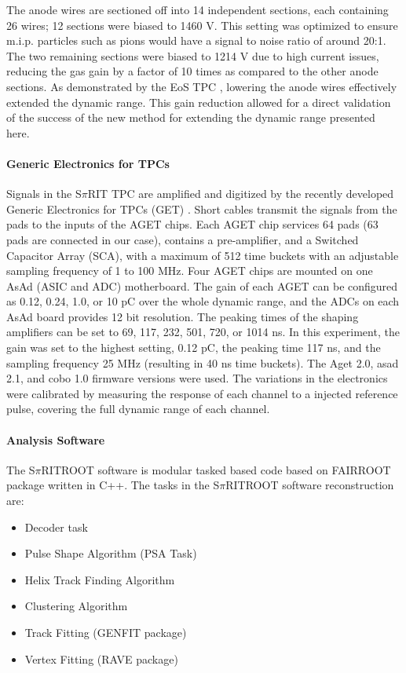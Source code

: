 \documentclass[review]{elsarticle}
\begin{document}
The anode wires are sectioned off into 14 independent sections, each containing 26 wires; 12 sections were biased to 1460 V. This setting was optimized to ensure m.i.p. particles such as pions would have a signal to noise ratio of around 20:1. The two remaining sections were biased to 1214 V due to high current issues, reducing the gas gain by a factor of 10 times as compared to the other anode sections. As demonstrated by the EoS TPC \citep{eos}, lowering the anode wires effectively extended the dynamic range.  This gain reduction allowed for a direct validation of the success of the new method for extending the dynamic range presented here. 

\paragraph{Generic Electronics for TPCs}
Signals in the S$\pi$RIT TPC are amplified and digitized by the recently developed Generic Electronics for TPCs (GET) \cite{get}.  Short cables transmit the signals from the pads to the inputs of the AGET chips. Each AGET chip services 64 pads (63 pads are connected in our case), contains a pre-amplifier, and a Switched Capacitor Array (SCA), with a maximum of 512 time buckets with an adjustable sampling frequency of 1 to 100 MHz. Four AGET chips are mounted on one AsAd (ASIC and ADC) motherboard. The gain of each AGET can be configured as 0.12, 0.24, 1.0, or 10 pC over the whole dynamic range, and the ADCs on each AsAd board provides 12 bit resolution. The peaking times of the shaping amplifiers can be set to 69, 117, 232, 501, 720, or 1014 ns. In this experiment, the gain was set to the highest setting, 0.12 pC, the peaking time 117 ns, and the sampling frequency 25 MHz (resulting in 40 ns time buckets). The Aget 2.0, asad 2.1, and cobo 1.0 firmware versions were used. The variations in the electronics were calibrated by measuring the response of each channel to a injected reference pulse, covering the full dynamic range of each channel. 

\paragraph{Analysis Software}
The S$\pi$RITROOT software is modular tasked based code based on FAIRROOT package written in C++. The tasks in the S$\pi$RITROOT software reconstruction are:
\begin{itemize}
  \item Decoder task
  \item Pulse Shape Algorithm (PSA Task)
  \item Helix Track Finding Algorithm
  \item Clustering Algorithm
  \item Track Fitting (GENFIT package)
  \item Vertex Fitting (RAVE package)
\end{itemize}
\end{document}
